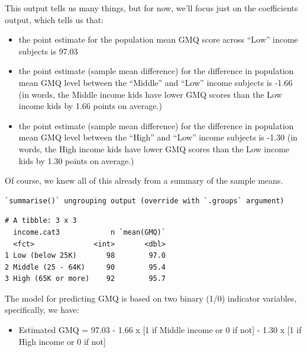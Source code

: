 \documentclass[
]{book}
\newenvironment{Shaded}{\begin{snugshade}}{\end{snugshade}}
\newcommand{\DataTypeTok}[1]{\textcolor[rgb]{0.13,0.29,0.53}{#1}}
\newcommand{\KeywordTok}[1]{\textcolor[rgb]{0.13,0.29,0.53}{\textbf{#1}}}
\newcommand{\NormalTok}[1]{#1}
\newcommand{\OperatorTok}[1]{\textcolor[rgb]{0.81,0.36,0.00}{\textbf{#1}}}
\newcommand{\StringTok}[1]{\textcolor[rgb]{0.31,0.60,0.02}{#1}}
\providecommand{\tightlist}{%
  \setlength{\itemsep}{0pt}\setlength{\parskip}{0pt}}
\begin{document}
This output tells us many things, but for now, we'll focus just on the coefficients output, which tells us that:

\begin{itemize}
\tightlist
\item
  the point estimate for the population mean GMQ score across ``Low'' income subjects is 97.03
\item
  the point estimate (sample mean difference) for the difference in population mean GMQ level between the ``Middle'' and ``Low'' income subjects is -1.66 (in words, the Middle income kids have lower GMQ scores than the Low income kids by 1.66 points on average.)
\item
  the point estimate (sample mean difference) for the difference in population mean GMQ level between the ``High'' and ``Low'' income subjects is -1.30 (in words, the High income kids have lower GMQ scores than the Low income kids by 1.30 points on average.)
\end{itemize}

Of course, we knew all of this already from a summary of the sample means.

\begin{Shaded}
\end{Shaded}

\begin{verbatim}
`summarise()` ungrouping output (override with `.groups` argument)
\end{verbatim}

\begin{verbatim}
# A tibble: 3 x 3
  income.cat3            n `mean(GMQ)`
  <fct>              <int>       <dbl>
1 Low (below 25K)       98        97.0
2 Middle (25 - 64K)     90        95.4
3 High (65K or more)    92        95.7
\end{verbatim}

The model for predicting GMQ is based on two binary (1/0) indicator variables, specifically, we have:

\begin{itemize}
\tightlist
\item
  Estimated GMQ = 97.03 - 1.66 x {[}1 if Middle income or 0 if not{]} - 1.30 x {[}1 if High income or 0 if not{]}
\end{itemize}
\end{document}
